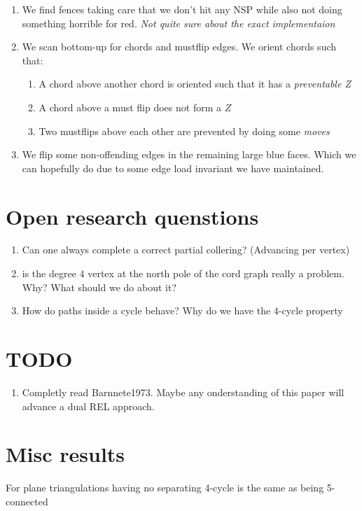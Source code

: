 \begin{enumerate}
  \item We find fences taking care that we don't hit any NSP while also not doing something horrible for red. \emph{Not quite sure about the exact implementaion}
  \item We scan bottom-up for chords and mustflip edges. We orient chords such that:
  \begin{enumerate}
    \item A chord above another chord is oriented such that it has a \emph{preventable Z}
    \item A chord above a must flip does not form a $Z$
    \item Two mustflips above each other are prevented by doing some \emph{moves}
  \end{enumerate}

  \item We flip some non-offending edges in the remaining large blue faces. Which we can hopefully do due to some edge load invariant we have maintained.
\end{enumerate}


\section{Open research quenstions}
  \begin{enumerate}
    \item Can one always complete a correct partial collering? (Advancing per vertex)
    \item is the degree $4$ vertex at the north pole of the cord graph really a problem. Why? What should we do about it?
    \item How do paths inside a cycle behave? Why do we have the $4$-cycle property
  \end{enumerate}

\section{TODO}
  \begin{enumerate}
    \item   Completly read Barnnete1973. Maybe any onderstanding of this paper will advance a dual REL approach.
  \end{enumerate}



\section{Misc results}
  \begin{lemma}
    \label{lm:5connIsNoSep4C}
    For plane triangulations having no separating 4-cycle is the same as being 5-connected
  \end{lemma}

